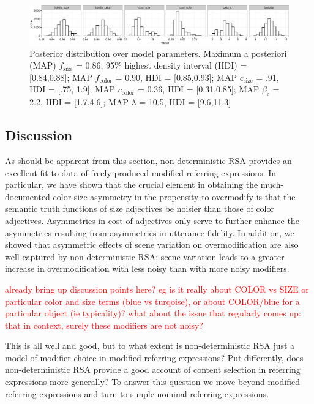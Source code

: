 \documentclass[11pt]{article}
\newcommand{\red}[1]{\textcolor{Red}{#1}}
\begin{document}
\begin{figure}
\centering
\includegraphics[width=\textwidth]{../../../models/1_basic_overinformativeness/results_bda/graphs/parameterposteriors-fixed-reducedconditions}
\caption{Posterior distribution over model parameters. Maximum a posteriori (MAP)  $f_{\textrm{size}}$ = 0.86, 95\% highest density interval (HDI) = [0.84,0.88]; MAP $f_{\textrm{color}}$ = 0.90, HDI = [0.85,0.93]; MAP $c_{\textrm{size}}$ = .91, HDI = [.75, 1.9]; MAP $c_{\textrm{color}}$ = 0.36, HDI = [0.31,0.85]; MAP $\beta_c$ = 2.2, HDI = [1.7,4.6]; MAP $\lambda$ = 10.5, HDI = [9.6,11.3]}
\label{fig:modifierparamposteriors}
\end{figure}

\subsection{Discussion}

As should be apparent from this section, non-deterministic RSA provides an excellent fit to data of freely produced modified referring expressions. In particular, we have shown that the crucial element in obtaining the much-documented color-size asymmetry in the propensity to overmodify is that the semantic truth functions of size adjectives be noisier than those of color adjectives. Asymmetries in cost of adjectives  only serve to further enhance the asymmetries resulting from asymmetries in utterance fidelity. In addition, we showed that asymmetric effects of scene variation on overmodification are also well captured by non-deterministic RSA: scene variation leads to a greater increase in overmodification with less noisy than with more noisy modifiers.

\red{already bring up discussion points here? eg is it really about COLOR vs SIZE or particular color and size terms (blue vs turqoise), or about COLOR/blue for a particular object (ie typicality)? what about the issue that regularly comes up: that in context, surely these modifiers are not noisy?}

This is all well and good, but to what extent is non-deterministic RSA just a model of modifier choice in modified referring expressions? Put differently, does non-deterministic RSA provide a good account of content selection in referring expressions more generally? To answer this question we move beyond modified referring expressions and turn to simple nominal referring expressions.
\end{document}
